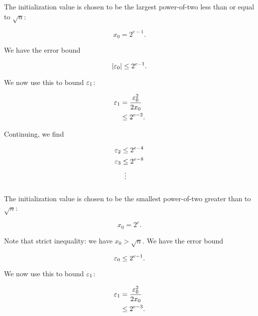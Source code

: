 \subsubsection{\UnrolledOne{}}
\label{app:error_bounds:unrolled1}

The initialization value is chosen to be the largest power-of-two
less than or equal to $\sqrt{n}$:

\begin{equation}
    x_{0} = 2^{e-1}.
\end{equation}

\noindent
We have the error bound

\begin{equation}
    \left| \varepsilon_{0} \right| \le 2^{e-1}.
\end{equation}

\noindent
We now use this to bound $\varepsilon_{1}$:

\begin{align}
    \varepsilon_{1} &= \frac{\varepsilon_{0}^{2}}{2x_{0}} \nonumber\\
        &\le 2^{e-2}.
\end{align}

\noindent
Continuing, we find

\begin{align}
    \varepsilon_{2} &\le 2^{e-4} \nonumber\\
    \varepsilon_{3} &\le 2^{e-8} \nonumber\\
        &\ \vdots
\end{align}


\subsubsection{\UnrolledTwo{}}
\label{app:error_bounds:unrolled2}

The initialization value is chosen to be the smallest power-of-two
greater than to $\sqrt{n}$:

\begin{equation}
    x_{0} = 2^{e}.
\end{equation}

\noindent
Note that strict inequality: we have $x_{0} > \sqrt{n}$.
We have the error bound

\begin{equation}
    \varepsilon_{0} \le 2^{e-1}.
\end{equation}

\noindent
We now use this to bound $\varepsilon_{1}$:

\begin{align}
    \varepsilon_{1} &= \frac{\varepsilon_{0}^{2}}{2x_{0}} \nonumber\\
        &\le 2^{e-3}.
\end{align}


